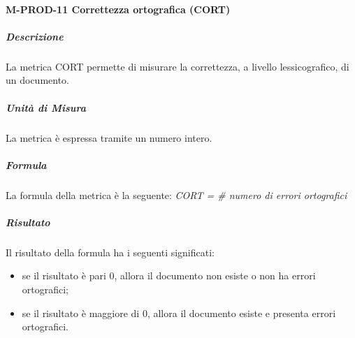 			\paragraph{M-PROD-11 Correttezza ortografica (CORT)}
				\subparagraph{Descrizione}
				La metrica CORT permette di misurare la correttezza, a livello lessicografico, di un documento.
				\subparagraph{Unità di Misura}
					La metrica è espressa tramite un numero intero.
				\subparagraph{Formula}
					La formula della metrica è la seguente:
					\textit{CORT = \# numero di errori ortografici}
				\subparagraph{Risultato}
					Il risultato della formula ha i seguenti significati:
					\begin{itemize}
						\item se il risultato è pari 0, allora il documento non esiste o non ha errori ortografici;
						\item se il risultato è maggiore di 0, allora il documento esiste e presenta errori ortografici.
					\end{itemize}
